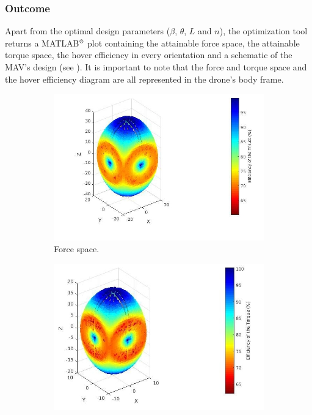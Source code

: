 \subsubsection{Outcome}
\label{sec:outcome}
Apart from the optimal design parameters ($\beta$, $\theta$, $L$ and $n$), the
optimization tool returns a MATLAB$^\textrm{\textregistered}$ plot containing
the attainable force space, the attainable torque space, the hover efficiency in
every orientation and a schematic of the MAV’s design (see ).
It is important to note that the force and torque space and the hover efficiency
diagram are all represented in the drone’s body frame.
\begin{figure}[!h]
  \begin{subfigure}[b]{0.48\textwidth}
    \includegraphics[width=\linewidth]{images/n=4_force.jpg}
    \caption{Force space.} \label{fig:tool_outputa}
  \end{subfigure}
  \hspace*{\fill} %
  \begin{subfigure}[b]{0.48\textwidth}
    \includegraphics[width=\linewidth]{images/n=4_torque.jpg}

\end{subfigure}
\end{figure}
